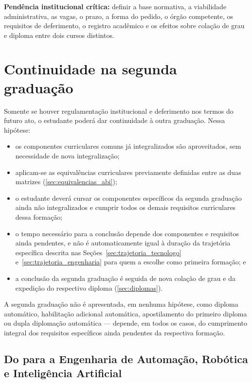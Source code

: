 \textbf{Pendência institucional crítica:} definir a base normativa, a viabilidade administrativa, as vagas, o prazo, a forma do pedido, o órgão competente, os requisitos de deferimento, o registro acadêmico e os efeitos sobre colação de grau e diploma entre dois cursos distintos.

\section{Continuidade na segunda graduação}
\label{sec:continuidade_segunda}

Somente se houver regulamentação institucional e deferimento nos termos do futuro ato, o estudante poderá dar continuidade à outra graduação. Nessa hipótese:

\begin{itemize}
    \item os componentes curriculares comuns já integralizados são aproveitados, sem necessidade de nova integralização;
    \item aplicam-se as equivalências curriculares previamente definidas entre as duas matrizes (\autoref{sec:equivalencias_abi});
    \item o estudante deverá cursar os componentes específicos da segunda graduação ainda não integralizados e cumprir todos os demais requisitos curriculares dessa formação;
    \item o tempo necessário para a conclusão depende dos componentes e requisitos ainda pendentes, e não é automaticamente igual à duração da trajetória específica descrita nas Seções~\ref{sec:trajetoria_tecnologo} e~\ref{sec:trajetoria_engenharia} para quem a escolhe como primeira formação; e
    \item a conclusão da segunda graduação é seguida de nova colação de grau e da expedição do respectivo diploma (\autoref{sec:diplomas}).
\end{itemize}

A segunda graduação não é apresentada, em nenhuma hipótese, como diploma automático, habilitação adicional automática, apostilamento do primeiro diploma ou dupla diplomação automática — depende, em todos os casos, do cumprimento integral dos requisitos específicos ainda pendentes da respectiva formação.

\subsection{Do \ppccurso para a Engenharia de Automação, Robótica e Inteligência Artificial}

